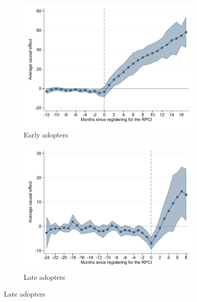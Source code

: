 \documentclass[oneside,11pt]{article}
\begin{document}
\begin{figure}[H]
    \caption{Event studies - RPCI effect on wage by cohort}
    \label{event_study_cohort}
    \begin{center}
    
    \begin{subfigure}{0.49\textwidth}
    \caption{Early adopters}
    \includegraphics[width=\textwidth]{04_Figures/muestra_10porciento/event_study_sal_cierre_chaisemartin_adopters_early.pdf}
    \end{subfigure}
    \begin{subfigure}{0.49\textwidth}
    \caption{Late adopters}
    \includegraphics[width=\textwidth]{04_Figures/muestra_10porciento/event_study_sal_cierre_chaisemartin_adopters_late.pdf}
    \end{subfigure}
    

\end{center}
\end{figure}
\end{document}
